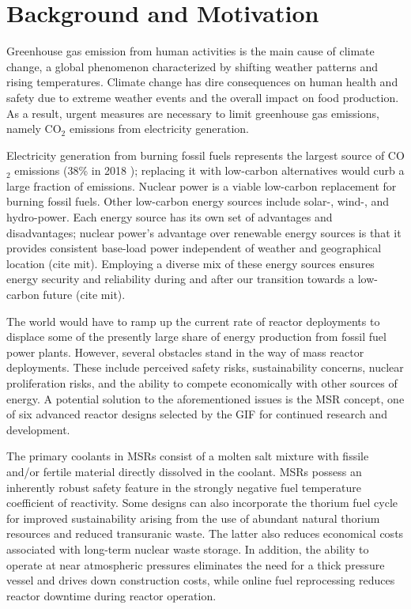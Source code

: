 \section{Background and Motivation}

Greenhouse gas emission from human activities is the main cause of climate
change, a global phenomenon characterized by shifting weather patterns and
rising temperatures. Climate change has dire consequences on human health and
safety due to extreme weather events and the overall impact on food
production. As a result, urgent measures are necessary to limit greenhouse gas
emissions, namely CO$_2$ emissions from electricity generation.

Electricity generation from burning fossil fuels represents the
largest source of CO$_2$ emissions (38\% in 2018 \cite{iea_global_2019});
replacing it with low-carbon
alternatives would curb a large fraction of emissions. Nuclear power is
a viable low-carbon replacement for burning fossil fuels.
Other low-carbon energy sources include solar-, wind-, and hydro-power. Each
energy source has its own set of advantages and disadvantages; nuclear power's
advantage over renewable energy sources is that it provides consistent
base-load power independent of weather and geographical location (cite mit).
Employing a diverse mix of these energy sources ensures energy security and
reliability during and after our transition towards a low-carbon future (cite mit).

The world would have to ramp up the current rate of reactor deployments to
displace some of the
presently large share of energy production from fossil fuel power plants.
However, several obstacles stand in the way of mass reactor deployments. These
include perceived safety risks, sustainability concerns, nuclear proliferation
risks, and the ability to compete economically with other sources of energy.
A potential solution to the aforementioned issues is
the \gls{MSR} concept, one of six advanced reactor designs
selected by the \gls{GIF} \cite{gif_technology_2002} for continued research
and development.

The primary coolants in MSRs consist of a molten salt mixture
with fissile and/or fertile material directly dissolved in the coolant.
MSRs possess an inherently robust safety feature in the strongly negative fuel
temperature coefficient of reactivity. Some designs can also incorporate the
thorium fuel cycle for improved sustainability arising from the use of
abundant natural thorium resources and reduced transuranic waste. The
latter also reduces economical costs
associated with long-term nuclear waste storage. In addition, the ability to
operate at near atmospheric pressures eliminates the need for a thick pressure
vessel and drives down construction costs, while online fuel reprocessing
reduces reactor downtime during reactor operation.

